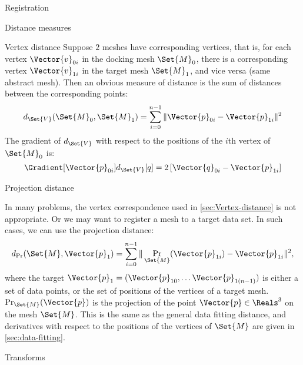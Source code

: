 \begin{plSection}{Registration}
\begin{plSection}{Distance measures}
\begin{plSection}{Vertex distance}
Suppose $2$ meshes have corresponding vertices,
that is,
for each vertex $\Vector{v}_{0i}$ in the docking mesh $\Set{M}_0$,
there is a corresponding vertex $\Vector{v}_{1i}$ 
in the target mesh $\Set{M}_1$,
and vice versa (same abstract mesh).
Then an obvious measure of distance
is the sum of distances between the corresponding points:
\begin{equation}
d_{\Set{V}}(\Set{M}_0,\Set{M}_1) = 
\sum_{i=0}^{n-1} \| \Vector{p}_{0i} - \Vector{p}_{1i} \|^2
\end{equation}
The gradient of $d_{\Set{V}}$ with respect to the positions
of the $i$th vertex of $\Set{M}_0$ is:
\begin{equation}
\Gradient[\Vector{p}_{0i}]{d_{\Set{V}}}[q] = 
2 \left[ \Vector{q}_{0i} - \Vector{p}_{1i} \right]
\end{equation}

\end{plSection}%
\begin{plSection}{Projection distance}
\label{sec:Projection-distance}

In many problems, the vertex correspondence used in
\cref{sec:Vertex-distance} is not appropriate.
Or we may want to register a mesh to a target data set.
In such cases, we can use the projection distance:
\begin{equation}
d_{\Pr}(\Set{M},\Vector{p}_1) 
= \sum_{i=0}^{n-1} \| 
\Pr_{\Set{M}}(\Vector{p}_{1i}) - \Vector{p}_{1i} \|^2,
\end{equation}
where the target 
$\Vector{p}_1 = (\Vector{p}_{10}, \ldots \Vector{p}_{1(n-1)})$
is either a set of data points,
or the set of positions of the vertices of a target mesh.
$\Pr_{\Set{M}}(\Vector{p})$ is the projection of the point 
$\Vector{p} \in \Reals^3$
on the mesh $\Set{M}$.
This is the same as the general data fitting distance, and
derivatives with respect to the positions of the vertices
of $\Set{M}$ are given in \cref{sec:data-fitting}.

\end{plSection}%
\end{plSection}%
\begin{plSection}{Transforms}
\label{sec:Transforms}


\end{plSection}
\end{plSection}
